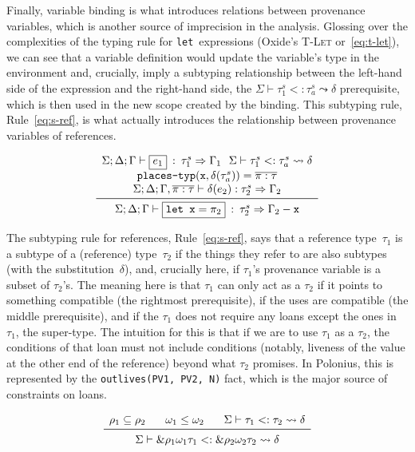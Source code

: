 \documentclass[11pt,a4paper,twoside,openany]{report}
\newcommand{\InRust}[1]{\texttt{#1}}
\newcommand{\InDatalog}[1]{\texttt{#1}}
\newcommand{\expression}[1]{\boxed{#1}}
\newcommand{\ntyperule}[2]{\begin{array}{c}#1\\\midrule\raisebox{1pt}{\strut}#2\end{array}}
\renewcommand\_{\textunderscore\allowbreak}
\begin{document}
Finally, variable binding is what introduces relations between provenance
variables, which is another source of imprecision in the analysis. Glossing over
the complexities of the typing rule for \InRust{let}~expressions (Oxide's
\textsc{T-Let} or~\eqref{eq:t-let}), we can see that a variable definition would
update the variable's type in the environment and, crucially, imply a
subtyping relationship between the left-hand side of the expression and the
right-hand side, the $\Sigma \vdash \tau_1 ^s <: \tau_a^s \leadsto \delta$
prerequisite, which is then used in the new scope created by the binding. This
subtyping rule, Rule~\eqref{eq:s-ref}, is what actually introduces the
relationship between provenance variables of references.

\begin{equation}\label{eq:t-let}
  \ntyperule{
    \Sigma ; \Delta ; \Gamma \vdash \expression{e_1} \: : \: \tau_1^s \Rightarrow \Gamma_1
    \:\:\: \Sigma \vdash \tau_1 ^s <: \tau_a^s \leadsto \delta \\
    \texttt{places-typ}(\mathtt{x}, \delta(\tau^s_a)) = \overline{\pi : \tau} \\
    \Sigma ; \Delta ; \Gamma, \overline{\pi : \tau} \vdash \delta(e_2) : \tau_2^s \Rightarrow \Gamma_2
  }
  {\Sigma ; \Delta ; \Gamma \vdash \expression{\texttt{let } \mathtt{x} = \pi_2} \: : \: \tau_2^s \Rightarrow \Gamma_2 - \mathtt{x}}
\end{equation}

The subtyping rule for references, Rule~\eqref{eq:s-ref}, says that a reference
type~$\tau_1$ is a subtype of a (reference) type~$\tau_2$ if the things they
refer to are also subtypes (with the substitution~$\delta$), and, crucially
here, if $\tau_1$'s provenance variable is a subset of $\tau_2$'s. The meaning
here is that $\tau_1$ can only act as a $\tau_2$ if it points to something
compatible (the rightmost prerequisite), if the uses are compatible (the middle
prerequisite), and if the $\tau_1$ does not require any loans except the ones in
$\tau_1$, the super-type. The intuition for this is that if we are to use
$\tau_1$ as a $\tau_2$, the conditions of that loan must not include conditions
(notably, liveness of the value at the other end of the reference) beyond what
$\tau_2$ promises. In Polonius, this is represented by the
\InDatalog{outlives(PV1, PV2, N)} fact, which is the major source of constraints
on loans.

\begin{equation}\label{eq:s-ref}
  \ntyperule{
    \rho_1 \subseteq \rho_2 \:\:\:\:\:\:\:\:
    \omega_1 \leq \omega_2 \:\:\:\:\:\:\:\:
    \Sigma \vdash \tau_1 <: \tau_2 \leadsto \delta
  }
  {
    \Sigma \vdash \&\rho_1 \omega_1 \tau_1 <: \& \rho_2 \omega_2 \tau_2 \leadsto \delta
  }
\end{equation}
\end{document}
